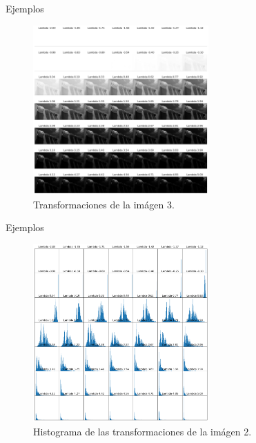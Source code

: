 \documentclass{beamer}
\begin{document}
\begin{frame}{Ejemplos}

    \begin{figure}
        \centering
        \includegraphics[width=0.6\textwidth]{all_lambda_3.png}
        \caption{Transformaciones de la im\'agen 3.}
        \label{fig:all_lambda_2}
    \end{figure}
\end{frame}

\begin{frame}{Ejemplos}

    \begin{figure}
        \centering
        \includegraphics[width=0.6\textwidth]{all_lambda_hist_3.png}
        \caption{Histograma de las transformaciones de la im\'agen 2.}
        \label{fig:img_bci_hist_2}
    \end{figure}
\end{frame}
\end{document}
